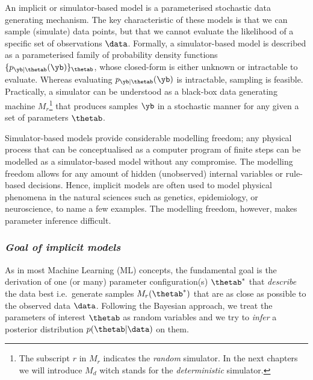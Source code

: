 
An implicit or simulator-based model is a parameterised stochastic
data generating mechanism. The key characteristic
of these models is that we can sample (simulate) data points,
but that we cannot evaluate the likelihood of a specific set of observations
$\data$. Formally, a simulator-based model is described as a
parameterised family of probability density functions
$\{ p_{\yb|\thetab}(\yb) \}_{\thetab}$, whose closed-form is either
unknown or intractable to evaluate. Whereas evaluating
$p_{\yb|\thetab}(\yb)$ is intractable, sampling is
feasible. Practically, a simulator can be understood as a black-box
data generating machine $M_r$\footnote{The subscript $r$ in $M_r$ indicates the
  \textit{random} simulator. In the next chapters we will introduce
  $M_d$ witch stands for the \textit{deterministic} simulator.} that
produces samples $\yb$ in a stochastic manner for any given a set of parameters $\thetab$.%

Simulator-based models provide considerable modelling freedom; any physical process that can be
conceptualised as a computer program of finite steps can be modelled
as a simulator-based model without any compromise. The modelling
freedom allows for any amount of hidden (unobserved) internal variables
or rule-based decisions. Hence, implicit models are often used to
model physical phenomena in the natural sciences such as genetics, epidemiology, or neuroscience, to name a few examples.
The modelling freedom, however, makes parameter inference difficult.


\subsubsection*{\textit{Goal of implicit models}}

As in most Machine Learning (ML) concepts, the fundamental goal is the
derivation of one (or many) parameter configuration(s) $\thetab^*$
that \textit{describe} the data best i.e.\ generate samples
$M_r(\thetab^*)$ that are as close as possible to the observed data
$\data$. Following the Bayesian approach, we treat the
parameters of interest $\thetab$ as random variables and we try to
\textit{infer} a posterior distribution $p(\thetab|\data)$ on them.
